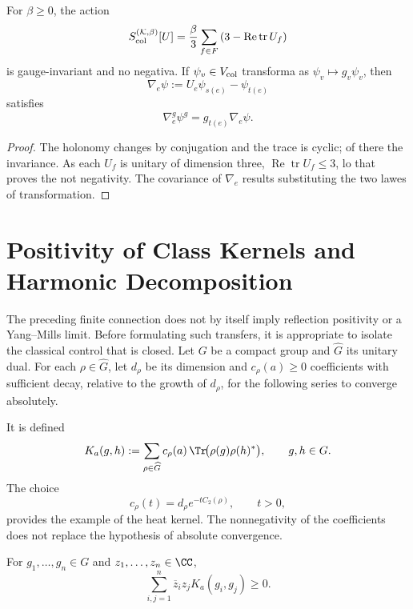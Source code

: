\begin{proposition}
\label{prop:wilson-color-finito}
For \(\beta\ge0\), the action
\[
 S_{\rm col}^{(\mathcal K,\beta)}[U]
 =\frac{\beta}{3}\sum_{f\in F}
 \left(3-\operatorname{Re}\operatorname{tr}U_f\right)
\]
is gauge-invariant and no negativa. If
\(\psi_v\in V_{\rm col}\) transforma as
\(\psi_v\mapsto g_v\psi_v\), then
\[
 \nabla_e\psi:=U_e\psi_{s(e)}-\psi_{t(e)}
\]
satisfies
\[
 \nabla_e^g\psi^g=g_{t(e)}\nabla_e\psi.
\]
\end{proposition}

\begin{proof}
The holonomy changes by conjugation and the trace is cyclic; of there the
invariance. As each \(U_f\) is unitary of dimension three,
\(\operatorname{Re}\operatorname{tr}U_f\le3\), lo that proves the not
negativity. The covariance of \(\nabla_e\) results substituting the two lawes
of transformation.
\end{proof}

\section{Positivity of Class Kernels and Harmonic Decomposition}

The preceding finite connection does not by itself imply reflection
positivity or a Yang--Mills limit. Before formulating such transfers, it is
appropriate to isolate the classical control that is closed. Let \(G\) be a compact
group and \(\widehat G\) its unitary dual. For each
\(\rho\in\widehat G\), let \(d_\rho\) be its dimension and
\(c_\rho(a)\ge0\) coefficients with sufficient decay, relative to the
growth of \(d_\rho\), for the following series to converge
absolutely.

\begin{definition}
\label{pf84:YM-07}
It is defined
\[
 K_a(g,h):=
 \sum_{\rho\in\widehat G}
 c_\rho(a)\,
 \Tr\!\bigl(\rho(g)\rho(h)^*\bigr),
 \qquad g,h\in G.
\]
The choice
\[
 c_\rho(t)=d_\rho e^{-tC_2(\rho)},
 \qquad t>0,
\]
provides the example of the heat kernel. The nonnegativity of the
coefficients does not replace the hypothesis of absolute convergence.
\end{definition}

\begin{theorem}
\label{pf84:YM-08}
For \(g_1,\dots,g_n\in G\) and \(z_1,\dots,z_n\in\CC\),
\[
 \sum_{i,j=1}^n
 \overline z_i z_jK_a(g_i,g_j)\ge0.
\]
\end{theorem}

